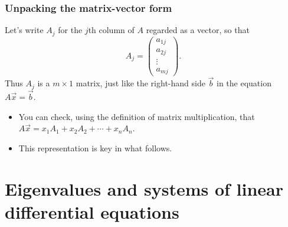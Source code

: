 \begin{frame}

\frametitle{Unpacking the matrix-vector form}
\label{unpackingthematrix-vectorform}

Let's write $ A_j $ for the $ j $th column of $ A $ regarded as a vector, so that
\[
    A_j = \begin{pmatrix} a_{1j} \\ a_{2j} \\ \vdots \\ a_{mj} \end{pmatrix}.
\]
Thus $ A_j $ is a $ m \times 1 $ matrix, just like the right-hand side $ \vec{b} $ in the equation $ A \vec{x} = \vec{b} $.

\begin{itemize}
\item You can check, using the definition of matrix multiplication, that
$ A \vec{x} = x_1 A_1 + x_2 A_2 + \cdots + x_n A_n$.

\item This representation is key in what follows.

\end{itemize}

\end{frame}

\section{Eigenvalues and systems of linear differential equations}
\label{eigenvaluesandsystemsoflineardifferentialequations}

